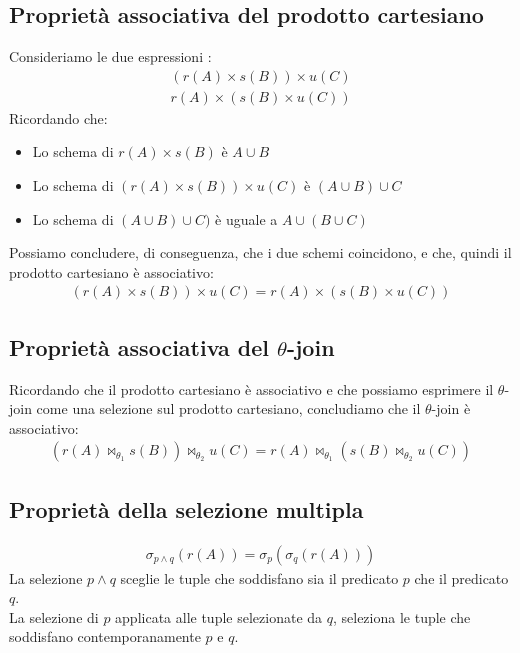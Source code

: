 \subsection{Proprietà associativa del prodotto cartesiano}
Consideriamo le due espressioni :
    \begin{equation}\begin{aligned}
        (r(A) \times s(B)) \times u(C)\\
        r(A) \times (s(B) \times u(C))
    \end{aligned}\end{equation}
Ricordando che:
    \begin{itemize}
        \item{Lo schema di $r(A) \times s(B)$ è $A \cup B$}
        \item{Lo schema di $(r(A) \times s(B)) \times u(C)$ è $(A \cup B) \cup C$}
        \item{Lo schema di $(A \cup B) \cup C)$ è uguale a $A \cup (B \cup C)$}
    \end{itemize}
Possiamo concludere, di conseguenza, che i due schemi coincidono, e che, quindi il prodotto cartesiano è associativo:
    \begin{equation}\begin{aligned}
        (r(A) \times s(B)) \times u(C) = r(A) \times (s(B) \times u(C))
    \end{aligned}\end{equation}

\subsection{Proprietà associativa del $\theta$-join}
Ricordando che il prodotto cartesiano è associativo e che possiamo esprimere il $\theta$-join come una selezione sul prodotto cartesiano, concludiamo che il $\theta$-join è associativo:
    \begin{equation}\begin{aligned}
        (r(A) \bowtie_{\theta_1} s(B))  \bowtie_{\theta_2} u(C) = 
        r(A) \bowtie_{\theta_1} (s(B)  \bowtie_{\theta_2} u(C))
    \end{aligned}\end{equation}
    
\subsection{Proprietà della selezione multipla}
    \begin{equation}\begin{aligned}
        \sigma_{p \wedge q} (r(A))= \sigma_p(\sigma_q(r(A)))
    \end{aligned}\end{equation}
La selezione $p \wedge q$ sceglie le tuple che soddisfano sia il predicato $p$ che il predicato $q$.\\
La selezione di $p$ applicata alle tuple selezionate da $q$, seleziona le tuple che soddisfano contemporanamente $p$ e $q$.


